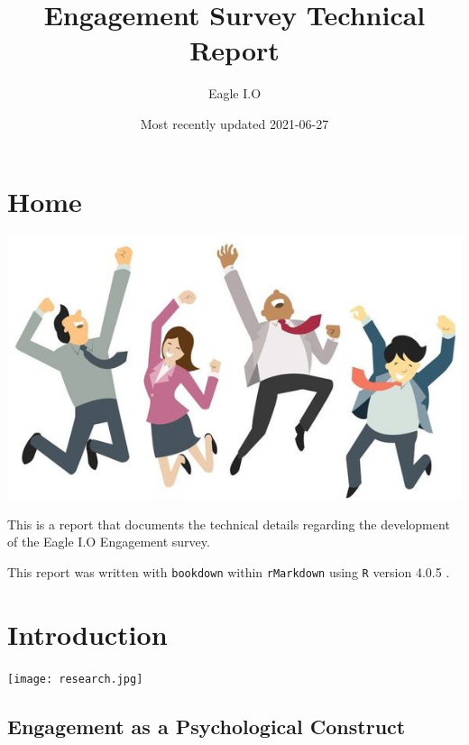 \documentclass[
]{book}
\title{Engagement Survey Technical Report}
\author{Eagle I.O}
\date{Most recently updated 2021-06-27}
\begin{document}
\maketitle

{
\setcounter{tocdepth}{4}
\tableofcontents
}
\hypertarget{home}{%
\chapter*{Home}\label{home}}

\includegraphics{EE.jpeg}

This is a report that documents the technical details regarding the development of the Eagle I.O Engagement survey.

This report was written with \texttt{bookdown} \citep{R-bookdown} within \texttt{rMarkdown} \citep{R-markdown} using \texttt{R} version 4.0.5 \citep{R-base}.

\hypertarget{intro}{%
\chapter{Introduction}\label{intro}}

\texttt{[image: research.jpg]}

\hypertarget{engagement-as-a-psychological-construct}{%
\section{Engagement as a Psychological Construct}\label{engagement-as-a-psychological-construct}}
\end{document}
